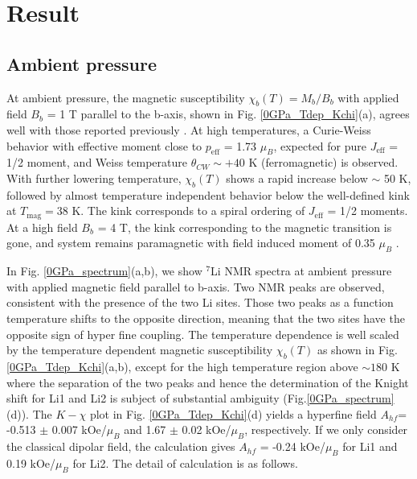 \chapter{Result}
\label{result}
\section{Ambient pressure}
At ambient pressure, the magnetic susceptibility $\chi_b(T)=M_b/B_b$ with applied field $B_b$ = 1 T parallel to the b-axis, shown in Fig. \ref{0GPa_Tdep_Kchi}(a),
agrees well with those reported previously \cite{takayama2015hyperhoneycomb}.
At high temperatures, a Curie-Weiss behavior with effective moment close to $p_\mathrm{eff}$ = 1.73 $\mu_B$, expected for pure $J_\mathrm{eff}$ = 1/2 moment,
and Weiss temperature $\theta_{CW} \sim +40$ K (ferromagnetic) is observed.
With further lowering temperature, $\chi_b(T)$ shows a rapid increase below $\sim$ 50 K,
followed by almost temperature independent behavior below the well-defined kink at $T_\mathrm{mag} = 38$ K.
The kink corresponds to a spiral ordering of $J_\mathrm{eff}$ = 1/2 moments.
At a high field $B_b$ = 4 T, the kink corresponding to the magnetic transition is gone, and system remains paramagnetic with field induced moment of 0.35 $\mu_B$
\cite{takayama2015hyperhoneycomb}.

In Fig. \ref{0GPa_spectrum}(a,b), we show ${}^7$Li NMR spectra at ambient pressure with applied magnetic field parallel to b-axis.
Two NMR peaks are observed, consistent with the presence of the two Li sites.
Those two peaks as a function temperature shifts to the opposite direction, meaning that the two sites have the opposite sign of hyper fine coupling.
The temperature dependence is well scaled by the temperature dependent magnetic susceptibility $\chi_b(T)$ as shown in Fig. \ref{0GPa_Tdep_Kchi}(a,b),
except for the high temperature region above $\sim 180$ K where the separation of the two peaks and hence the determination of the Knight shift for Li1 and Li2
is subject of substantial ambiguity (Fig.\ref{0GPa_spectrum}(d)).
The $K-\chi$ plot in Fig. \ref{0GPa_Tdep_Kchi}(d) yields a hyperfine field $A_{hf}$= -0.513 $\pm$ 0.007 kOe/$\mu_B$ and 1.67 $\pm$ 0.02 kOe/$\mu_B$, respectively.
If we only consider the classical dipolar field, the calculation gives $A_{hf}$ = -0.24 kOe/$\mu_B$ for Li1 and 0.19 kOe/$\mu_B$ for Li2.
The detail of calculation is as follows.

